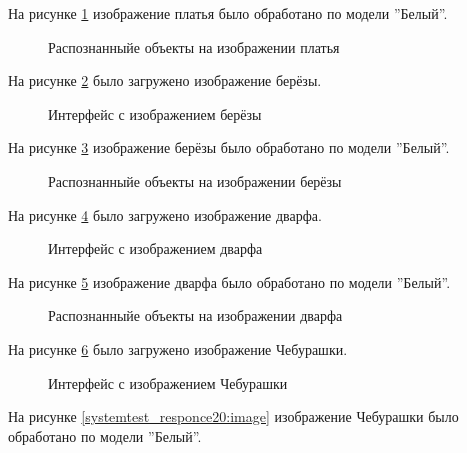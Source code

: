 На рисунке \ref{systemtest_responce14:image} изображение платья было обработано по модели ''Белый''.

\begin{figure}[H]
\caption{Распознанныйе объекты на изображении платья}
\label{systemtest_responce14:image}
\end{figure}

На рисунке \ref{systemtest_responce15:image} было загружено изображение берёзы.

\begin{figure}[H]
\caption{Интерфейс с изображением берёзы}
\label{systemtest_responce15:image}
\end{figure}

На рисунке \ref{systemtest_responce16:image} изображение берёзы было обработано по модели ''Белый''.

\begin{figure}[H]
\caption{Распознанныйе объекты на изображении берёзы}
\label{systemtest_responce16:image}
\end{figure}

На рисунке \ref{systemtest_responce17:image} было загружено изображение дварфа.

\begin{figure}[H]
\caption{Интерфейс с изображением дварфа}
\label{systemtest_responce17:image}
\end{figure}

На рисунке \ref{systemtest_responce18:image} изображение дварфа было обработано по модели ''Белый''.

\begin{figure}[H]
\caption{Распознанныйе объекты на изображении дварфа}
\label{systemtest_responce18:image}
\end{figure}
На рисунке \ref{systemtest_responce19:image} было загружено изображение Чебурашки.

\begin{figure}[H]
\caption{Интерфейс с изображением Чебурашки}
\label{systemtest_responce19:image}
\end{figure}

На рисунке \ref{systemtest_responce20:image} изображение Чебурашки было обработано по модели ''Белый''.

